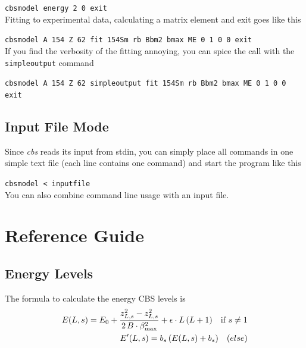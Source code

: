 \documentclass[10pt,a4paper]{article}
\begin{document}
\verb!cbsmodel energy 2 0 exit! \\
Fitting to experimental data, calculating a matrix element and exit goes like this

\verb!cbsmodel A 154 Z 62 fit 154Sm rb Bbm2 bmax ME 0 1 0 0 exit! \\
If you find the verbosity of the fitting annoying, you can spice the call with the \verb!simpleoutput! command

\verb!cbsmodel A 154 Z 62 simpleoutput fit 154Sm rb Bbm2 bmax ME 0 1 0 0 exit!

\subsection{Input File Mode}
Since \textit{cbs} reads its input from stdin, you can simply place all commands in one simple text file (each line contains one command) and start the program like this

\verb!cbsmodel < inputfile! \\
You can also combine command line usage with an input file.


\section{Reference Guide} \label{ReferenceGuide}
\subsection{Energy Levels}
The formula to calculate the energy CBS levels is
\begin{align}
E(L,s) = E_0 
     + \frac{z_{L,s}^2 - z_{L,s}^2}{2 \, B\cdot\beta_{\rm max}^2}
	 + \epsilon \cdot L\,(L+1)
	\quad \text{if $s\neq1$} \\
E'(L,s) = b_s \, (E(L,s)+b_s) \quad \text(else)
\end{align}
\end{document}
